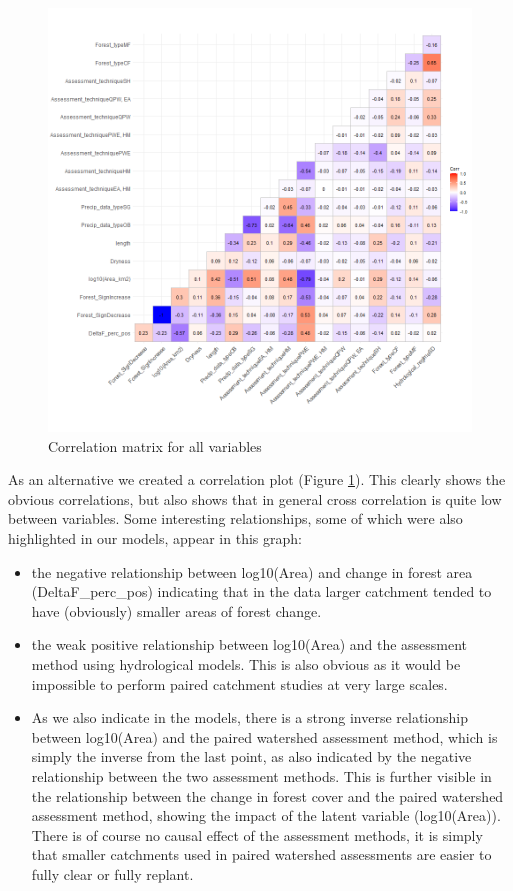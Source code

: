 \documentclass[]{elsarticle} %
\providecommand{\tightlist}{%
  \setlength{\itemsep}{0pt}\setlength{\parskip}{0pt}}
\begin{document}
\begin{figure}
\includegraphics[width=0.9\linewidth]{./testcorr_plot} \caption{Correlation matrix for all variables}\label{fig:corgraphs}
\end{figure}

As an alternative we created a correlation plot (Figure \ref{fig:corgraphs}). This clearly shows the obvious correlations, but also shows that in general cross correlation is quite low between variables. Some interesting relationships, some of which were also highlighted in our models, appear in this graph:

\begin{itemize}
\tightlist
\item
  the negative relationship between log10(Area) and change in forest area (DeltaF\_perc\_pos) indicating that in the data larger catchment tended to have (obviously) smaller areas of forest change.\\
\item
  the weak positive relationship between log10(Area) and the assessment method using hydrological models. This is also obvious as it would be impossible to perform paired catchment studies at very large scales.\\
\item
  As we also indicate in the models, there is a strong inverse relationship between log10(Area) and the paired watershed assessment method, which is simply the inverse from the last point, as also indicated by the negative relationship between the two assessment methods. This is further visible in the relationship between the change in forest cover and the paired watershed assessment method, showing the impact of the latent variable (log10(Area)). There is of course no causal effect of the assessment methods, it is simply that smaller catchments used in paired watershed assessments are easier to fully clear or fully replant.
\end{itemize}
\end{document}

